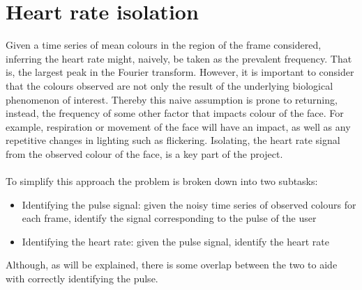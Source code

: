 














\section{Heart rate isolation}
Given a time series of mean colours in the region of the frame considered, inferring the heart rate might, naively, be taken as the prevalent frequency. That is, the largest peak in the Fourier transform. However, it is important to consider that the colours observed are not only the result of the underlying biological phenomenon of interest. Thereby this naive assumption is prone to returning, instead, the frequency of some other factor that impacts colour of the face. For example, respiration or movement of the face will have an impact, as well as any repetitive changes in lighting such as flickering. Isolating, the heart rate signal from the observed colour of the face, is a key part of the project.
\\\\
To simplify this approach the problem is broken down into two subtasks:
\begin{itemize}
    \item Identifying the pulse signal: given the noisy time series of observed colours for each frame, identify the signal corresponding to the pulse of the user
    \item Identifying the heart rate: given the pulse signal, identify the heart rate
\end{itemize}
Although, as will be explained, there is some overlap between the two to aide with correctly identifying the pulse.


